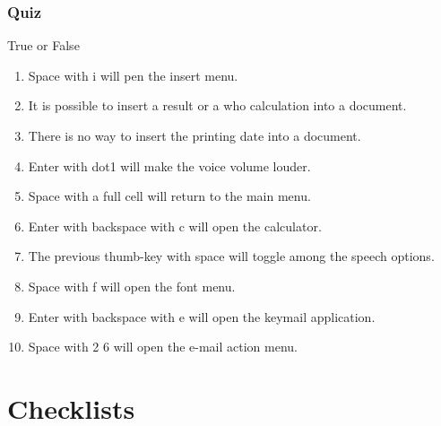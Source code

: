 \documentclass[10pt,letterpaper,twoside]{report}
\begin{document}
{{{\subsection{Quiz}
True or False
\begin{enumerate}
	\item Space with i will pen the insert menu.
	\item It is possible to insert a result or a who calculation into a document.
	\item There is no way to insert the printing date into a document.
	\item Enter with dot1 will make the voice volume louder.
	\item Space with a full cell will return to the main menu.
	\item Enter with backspace with c will open the calculator.
	\item The previous thumb-key with space will toggle among the speech options.
	\item Space with f will open the font menu.
	\item Enter with backspace with e will open the keymail application.
	\item Space with 2 6 will open the e-mail action menu.
\end{enumerate}

\clearpage

\chapter{Checklists}
}}}
\end{document}
